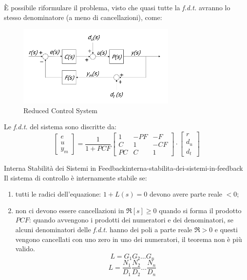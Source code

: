 \documentclass[12pt]{article}
\begin{document}
\`E possibile riformulare il problema, visto che quasi tutte la \emph{f.d.t.} avranno lo stesso denominatore (a meno di cancellazioni), come:
\begin{figure}[H]
    \centering
    \includegraphics[width=0.7\textwidth]{reduced-control-system.png}
    \caption{Reduced Control System}
    \label{fig:reduced-control-system}
\end{figure}
Le \emph{f.d.t.} del sistema sono discritte da:
\[ \begin{bmatrix} e \\ u \\ y_m  \end{bmatrix} = \frac{1}{1+PCF} \begin{bmatrix} 1 & -PF & -F \\ C & 1 & -CF \\ PC & C & 1 \end{bmatrix} \cdot \begin{bmatrix} r \\ d_u \\ d_t \end{bmatrix}  \]
\begin{theorem}{Interna Stabilit\`a dei Sistemi in Feedback}{interna-stabilita-dei-sistemi-in-feedback}
    Il sistema di controllo \`e internamente stabile se:
    \begin{enumerate}
        \item tutti le radici dell'equazione: $1+L(s) = 0$ devono avere parte reale $< 0$;
        \item non ci devono essere cancellazioni in $\Re[s] \geqslant 0$ quando si forma il prodotto $PCF$: quando avvengono i prodotti dei numeratori e dei denominatori, se alcuni denominatori delle \emph{f.d.t.} hanno dei poli a parte reale $\Re > 0$ e questi vengono cancellati con uno zero in uno dei numeratori, il teorema non \`e pi\`u valido.
            \[ L = G_1 G_2 \dots G_n \]
            \[ L = \frac{N_1}{D_1} \frac{N_2}{D_2} \dots \frac{N_n}{D_n} \]
    \end{enumerate}
\end{theorem}
\end{document}
